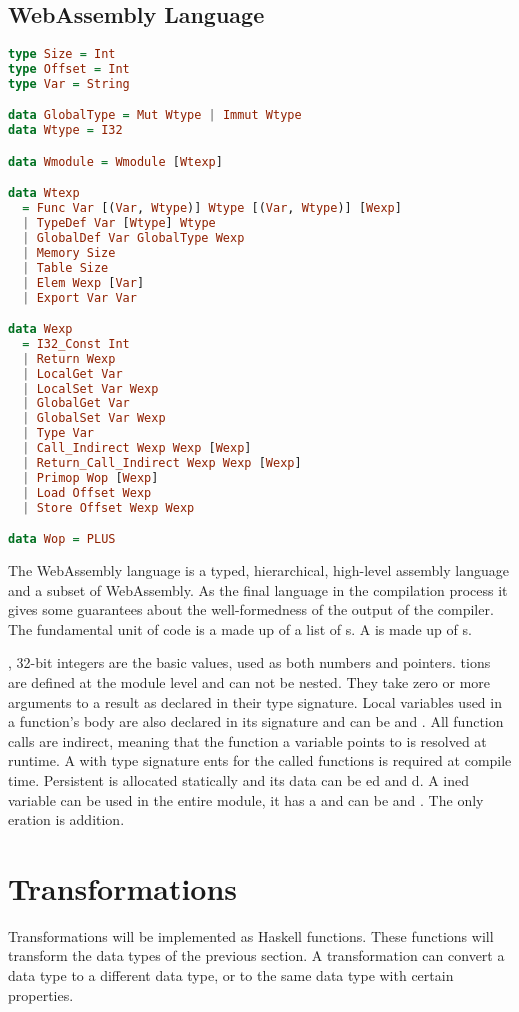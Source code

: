 \subsection{\label{subsection:webdata}WebAssembly Language}
\begin{lstlisting}[language=Haskell]
type Size = Int
type Offset = Int
type Var = String

data GlobalType = Mut Wtype | Immut Wtype
data Wtype = I32

data Wmodule = Wmodule [Wtexp]

data Wtexp
  = Func Var [(Var, Wtype)] Wtype [(Var, Wtype)] [Wexp]
  | TypeDef Var [Wtype] Wtype
  | GlobalDef Var GlobalType Wexp
  | Memory Size
  | Table Size
  | Elem Wexp [Var]
  | Export Var Var

data Wexp
  = I32_Const Int
  | Return Wexp
  | LocalGet Var
  | LocalSet Var Wexp
  | GlobalGet Var
  | GlobalSet Var Wexp
  | Type Var
  | Call_Indirect Wexp Wexp [Wexp]
  | Return_Call_Indirect Wexp Wexp [Wexp]
  | Primop Wop [Wexp]
  | Load Offset Wexp
  | Store Offset Wexp Wexp

data Wop = PLUS
\end{lstlisting}

The WebAssembly language is a typed, hierarchical, high-level assembly language and a subset of WebAssembly. As the final language in the compilation process it gives some guarantees about the well-formedness of the output of the compiler. The fundamental unit of code is a  made up of a list of s. A  is made up of s.

, 32-bit integers are the basic values, used as both numbers and pointers. tions are defined at the module level and can not be nested. They take zero or more arguments to a result as declared in their type signature. Local variables used in a function's body are also declared in its signature and can be  and . All function calls are indirect, meaning that the function a variable points to is resolved at runtime. A  with type signature ents for the called functions is required at compile time. Persistent  is allocated statically and its data can be ed and d. A ined variable can be used in the entire module, it has a  and can be  and . The only eration is addition.

\section{\label{section:transforms}Transformations}
Transformations will be implemented as Haskell functions. These functions will transform the data types of the previous section. A transformation can convert a data type to a different data type, or to the same data type with certain properties.

